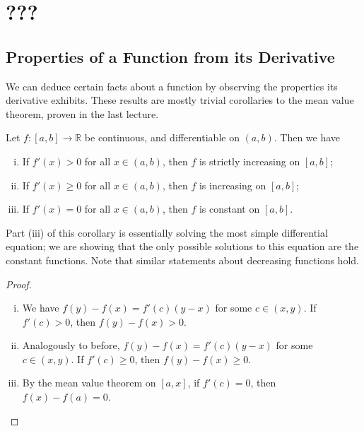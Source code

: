 \documentclass{article}
\begin{document}
\section{???}
\subsection{Properties of a Function from its Derivative}
We can deduce certain facts about a function by observing the properties its derivative exhibits. These results are mostly trivial corollaries to the mean value theorem, proven in the last lecture.
\begin{corollary}
	Let $f \colon [a,b] \to \mathbb R$ be continuous, and differentiable on $(a, b)$. Then we have
	\begin{enumerate}[(i)]
		\item If $f'(x) > 0$ for all $x \in (a, b)$, then $f$ is strictly increasing on $[a, b]$;
		\item If $f'(x) \geq 0$ for all $x \in (a, b)$, then $f$ is increasing on $[a, b]$;
		\item If $f'(x) = 0$ for all $x \in (a, b)$, then $f$ is constant on $[a, b]$.
	\end{enumerate}
\end{corollary}
\noindent Part (iii) of this corollary is essentially solving the most simple differential equation; we are showing that the only possible solutions to this equation are the constant functions. Note that similar statements about decreasing functions hold.
\begin{proof}
	\begin{enumerate}[(i)]
		\item We have $f(y) - f(x) = f'(c)(y-x)$ for some $c \in (x, y)$. If $f'(c) > 0$, then $f(y) - f(x) > 0$.
		\item Analogously to before, $f(y) - f(x) = f'(c)(y-x)$ for some $c \in (x, y)$. If $f'(c) \geq 0$, then  $f(y) - f(x) \geq 0$.
		\item By the mean value theorem on $[a, x]$, if $f'(c) = 0$, then $f(x) - f(a) = 0$.
	\end{enumerate}
\end{proof}
\end{document}
